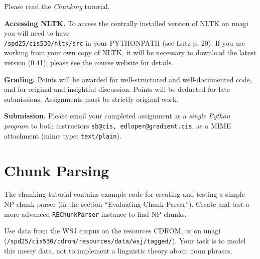 \documentclass{cis530}
\begin{document}
\maketitle

Please read the \emph{Chunking} tutorial.

{\bf Accessing NLTK.}  
To access the centrally installed version of NLTK on unagi you will
need to have\\ \texttt{/spd25/cis530/nltk/src} in your PYTHONPATH (see
Lutz p. 20).  If you are working from your own copy of NLTK, it will
be necessary to download the latest version (0.41); please see the
course website for details.

{\bf Grading.}
Points will be awarded for well-structured and well-documented code,
and for original and insightful discussion.
Points will be deducted for late submissions.  Assignments must be
strictly original work.

{\bf Submission.}  
Please email your completed assignment as a
\emph{single Python program} to both instructors
\texttt{sb@cis, edloper@gradient.cis}, as a MIME attachment
(mime type: \texttt{text/plain}).
\vspace{2ex}


\section{Chunk Parsing}

  The chunking tutorial contains example code for creating and testing
  a simple NP chunk parser (in the section ``Evaluating Chunk
  Parser'').  Create and test a more advanced \texttt{REChunkParser}
  instance to find NP chunks.

  Use data from the WSJ corpus on the resources CDROM, or on
  unagi (\texttt{/spd25/cis530/cdrom/resources/data/wsj/tagged/}).
  Your task is to model this messy data, not to
  implement a linguistic theory about noun phrases.
\end{document}
